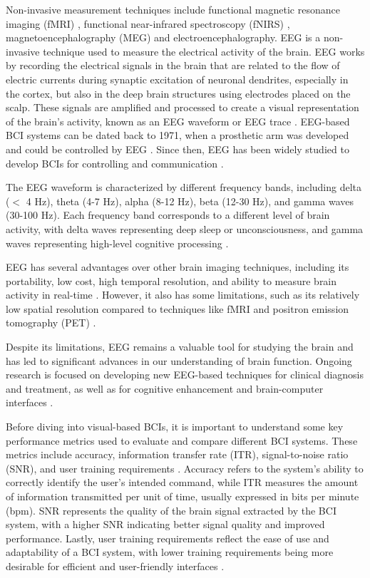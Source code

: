 Non-invasive measurement techniques include functional magnetic resonance imaging (fMRI) \cite{glover2011overview}, functional near-infrared spectroscopy (fNIRS) \cite{chen2020functional}, magnetoencephalography (MEG) \cite{singh2014magnetoencephalography} and electroencephalography.
EEG is a non-invasive technique used to measure the electrical activity of the brain. EEG works by recording the electrical signals in the brain that are related to the flow of electric currents during synaptic excitation of neuronal dendrites, especially in the cortex, but also in the deep brain structures \cite{nicolasalonso2012brain} using electrodes placed on the scalp. These signals are amplified and processed to create a visual representation of the brain's activity, known as an EEG waveform or EEG trace \cite{bear2016neuroscience}. EEG-based BCI systems can be dated back to 1971, when a prosthetic arm was developed and could be controlled by EEG \cite{nirenberg1971new}. Since then, EEG has been widely studied to develop BCIs for controlling and communication \cite{birbaumer2007brain}.

The EEG waveform is characterized by different frequency bands, including delta ($<$ 4 Hz), theta (4-7 Hz), alpha (8-12 Hz), beta (12-30 Hz), and gamma waves (30-100 Hz). Each frequency band corresponds to a different level of brain activity, with delta waves representing deep sleep or unconsciousness, and gamma waves representing high-level cognitive processing \cite{schwartz2004cortical}.

EEG has several advantages over other brain imaging techniques, including its portability, low cost, high temporal resolution, and ability to measure brain activity in real-time \cite{niedermeyer2005electroencephalography}. However, it also has some limitations, such as its relatively low spatial resolution compared to techniques like fMRI and positron emission tomography (PET) \cite{luck2014introduction}.

Despite its limitations, EEG remains a valuable tool for studying the brain and has led to significant advances in our understanding of brain function. Ongoing research is focused on developing new EEG-based techniques for clinical diagnosis and treatment, as well as for cognitive enhancement and brain-computer interfaces \cite{mullerputz2005steadystate}.

Before diving into visual-based BCIs, it is important to understand some key performance metrics used to evaluate and compare different BCI systems. These metrics include accuracy, information transfer rate (ITR), signal-to-noise ratio (SNR), and user training requirements \cite{wolpaw2002brain}. Accuracy refers to the system's ability to correctly identify the user's intended command, while ITR measures the amount of information transmitted per unit of time, usually expressed in bits per minute (bpm). SNR represents the quality of the brain signal extracted by the BCI system, with a higher SNR indicating better signal quality and improved performance. Lastly, user training requirements reflect the ease of use and adaptability of a BCI system, with lower training requirements being more desirable for efficient and user-friendly interfaces \cite{kubler2007introduction}.

